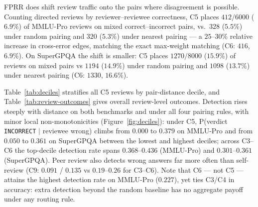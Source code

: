 \documentclass[11pt]{article}
\begin{document}
FPRR does shift review traffic onto the pairs where disagreement is possible. Counting directed reviews by reviewer--reviewee correctness, C5 places $412/6000$ ($6.9\%$) of MMLU-Pro reviews on mixed correct--incorrect pairs, vs.\ $328$ ($5.5\%$) under random pairing and $320$ ($5.3\%$) under nearest pairing --- a $25$--$30\%$ relative increase in cross-error edges, matching the exact max-weight matching (C6: $416$, $6.9\%$). On SuperGPQA the shift is smaller: C5 places $1270/8000$ ($15.9\%$) of reviews on mixed pairs vs $1194$ ($14.9\%$) under random pairing and $1098$ ($13.7\%$) under nearest pairing (C6: $1330$, $16.6\%$).

Table~\ref{tab:deciles} stratifies all C5 reviews by pair-distance decile, and Table~\ref{tab:review-outcomes} gives overall review-level outcomes. Detection rises steeply with distance on both benchmarks and under all four pairing rules, with minor local non-monotonicities (Figure~\ref{fig:deciles}): under C5, P(verdict \texttt{INCORRECT} $\mid$ reviewee wrong) climbs from $0.000$ to $0.379$ on MMLU-Pro and from $0.050$ to $0.361$ on SuperGPQA between the lowest and highest deciles; across C3--C6 the top-decile detection rate spans $0.368$--$0.436$ (MMLU-Pro) and $0.301$--$0.361$ (SuperGPQA). Peer review also detects wrong answers far more often than self-review (C9: $0.091$ / $0.135$ vs $0.19$--$0.26$ for C3--C6). Note that C6 --- not C5 --- attains the highest detection rate on MMLU-Pro ($0.227$), yet ties C3/C4 in accuracy: extra detection beyond the random baseline has no aggregate payoff under any routing rule.
\end{document}
